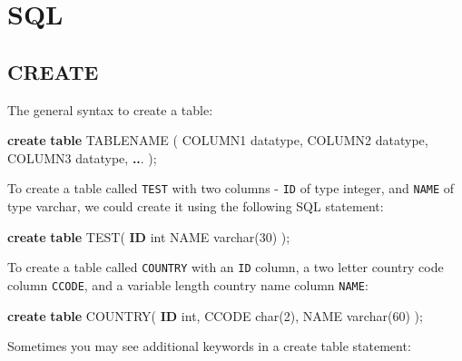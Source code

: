 \documentclass[
]{book}
\newenvironment{Shaded}{\begin{snugshade}}{\end{snugshade}}
\newcommand{\DataTypeTok}[1]{\textcolor[rgb]{0.13,0.29,0.53}{#1}}
\newcommand{\DecValTok}[1]{\textcolor[rgb]{0.00,0.00,0.81}{#1}}
\newcommand{\KeywordTok}[1]{\textcolor[rgb]{0.13,0.29,0.53}{\textbf{#1}}}
\newcommand{\NormalTok}[1]{#1}
\newcommand{\OperatorTok}[1]{\textcolor[rgb]{0.81,0.36,0.00}{\textbf{#1}}}
\begin{document}
\hypertarget{sql}{%
\chapter{SQL}\label{sql}}

\hypertarget{create}{%
\section{CREATE}\label{create}}

The general syntax to create a table:

\begin{Shaded}
\begin{Highlighting}[]
\KeywordTok{create} \KeywordTok{table}\NormalTok{ TABLENAME (}
\NormalTok{  COLUMN1 datatype, }
\NormalTok{  COLUMN2 datatype, }
\NormalTok{  COLUMN3 datatype, }
  \OperatorTok{..}\NormalTok{. );}
\end{Highlighting}
\end{Shaded}

To create a table called \texttt{TEST} with two columns - \texttt{ID} of type integer, and \texttt{NAME} of type varchar, we could create it using the following SQL statement:

\begin{Shaded}
\begin{Highlighting}[]
\KeywordTok{create} \KeywordTok{table}\NormalTok{ TEST(}
  \KeywordTok{ID} \DataTypeTok{int}
\NormalTok{  NAME }\DataTypeTok{varchar}\NormalTok{(}\DecValTok{30}\NormalTok{)}
\NormalTok{);}
\end{Highlighting}
\end{Shaded}

To create a table called \texttt{COUNTRY} with an \texttt{ID} column, a two letter country code column \texttt{CCODE}, and a variable length country name column \texttt{NAME}:

\begin{Shaded}
\begin{Highlighting}[]
\KeywordTok{create} \KeywordTok{table}\NormalTok{ COUNTRY(}
    \KeywordTok{ID} \DataTypeTok{int}\NormalTok{,}
\NormalTok{    CCODE }\DataTypeTok{char}\NormalTok{(}\DecValTok{2}\NormalTok{),}
\NormalTok{    NAME }\DataTypeTok{varchar}\NormalTok{(}\DecValTok{60}\NormalTok{)}
\NormalTok{);}
\end{Highlighting}
\end{Shaded}

Sometimes you may see additional keywords in a create table statement:
\end{document}
